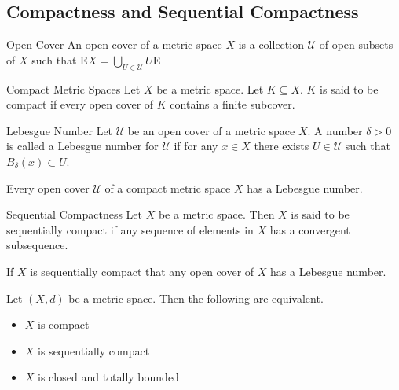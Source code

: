 \subsection{Compactness and Sequential Compactness}
\begin{defn}{Open Cover}{} An open cover of a metric space $X$ is a collection $\mathcal{U}$ of open subsets of $X$ such that E$X=\bigcup_{U\in\mathcal{U}}U$E
\end{defn}

\begin{defn}{Compact Metric Spaces}{} Let $X$ be a metric space. Let $K\subseteq X$. $K$ is said to be compact if every open cover of $K$ contains a finite subcover. 
\end{defn}

\begin{defn}{Lebesgue Number}{} Let $\mathcal{U}$ be an open cover of a metric space $X$. A number $\delta>0$ is called a Lebesgue number for $\mathcal{U}$ if for any $x\in X$ there exists $U\in\mathcal{U}$ such that $B_\delta(x)\subset U$. 
\end{defn}

\begin{lmm}{}{} Every open cover $\mathcal{U}$ of a compact metric space $X$ has a Lebesgue number. 
\end{lmm}

\begin{defn}{Sequential Compactness}{} Let $X$ be a metric space. Then $X$ is said to be sequentially compact if any sequence of elements in $X$ has a convergent subsequence. 
\end{defn}

\begin{lmm}{}{} If $X$ is sequentially compact that any open cover of $X$ has a Lebesgue number. 
\end{lmm}

\begin{prp}{}{} Let $(X,d)$ be a metric space. Then the following are equivalent. 
\begin{itemize}
\item $X$ is compact
\item $X$ is sequentially compact
\item $X$ is closed and totally bounded
\end{itemize}
\end{prp}

